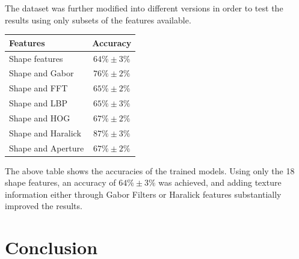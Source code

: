 \documentclass[runningheads,a4paper]{llncs}
\begin{document}
The dataset was further modified into different versions in order to test the results using only subsets of the features available.

\begin{table}
    \centering
        \begin{tabular}{ l c }
            \toprule
            Features & Accuracy \\ \midrule
            Shape features & $64\% \pm 3\%$ \\ 
            Shape and Gabor & $76\% \pm 2\%$ \\ 
            Shape and FFT & $65\% \pm 2\%$ \\ 
            Shape and LBP & $65\% \pm 3\%$ \\ 
            Shape and HOG & $67\% \pm 2\%$ \\ 
            Shape and Haralick & $87\% \pm 3\%$ \\ 
            Shape and Aperture & $67\% \pm 2\%$ \\
            \bottomrule
        \end{tabular}
\end{table}

The above table shows the accuracies of the trained models. Using only the 18 shape features, an accuracy of $64\% \pm 3\%$ was achieved, and adding texture information either through Gabor Filters or Haralick features substantially improved the results.

  
  
  
  
  
  
  
  
  
  
  
  
  
  
  
  
  
  
  
  
  
  

\section{Conclusion}
\end{document}
